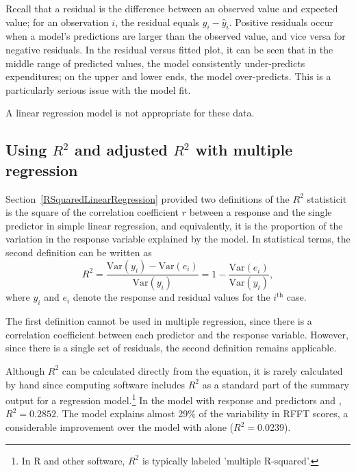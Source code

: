 \begin{example}
Recall that a residual is the difference between an observed value and expected value; for an observation $i$, the residual equals $y_i - \hat{y}_i$. Positive residuals occur when a model's predictions are larger than the observed value, and vice versa for negative residuals. In the residual versus fitted plot, it can be seen that in the middle range of predicted values, the model consistently under-predicts expenditures; on the upper and lower ends, the model over-predicts. This is a particularly serious issue with the model fit. 

A linear regression model is not appropriate for these data.	
	
\end{example}


\subsection{Using $R^2$ and adjusted $R^2$ with multiple regression}

Section~\ref{RSquaredLinearRegression} provided two definitions of the $R^2$ statistic\textemdash it is the square of the correlation coefficient $r$ between a response and the single predictor in simple linear regression, and equivalently, it is the proportion of the variation in the response variable explained by the model.  In statistical terms, the second definition can be written as 
\[
   R^2 = \frac{\text{Var}(y_i) - \text{Var}(e_i)}
   {\text{Var}(y_i)} = 1 - \frac{\text{Var}(e_i)}{\text{Var}(y_i)},
   \label{RSquareDefinition}\]
where $y_i$ and $e_i$ denote the response and residual values for the
$i^{\text{th}}$ case.

The first definition cannot be used in multiple regression, since there is a correlation coefficient between each predictor and the response variable. However, since there is a single set of residuals, the second definition remains applicable. 

Although $R^2$ can be calculated directly from the equation, it is rarely calculated by hand since computing software includes $R^2$ as a standard part of the summary output for a regression model.\footnote{In \textsf{R} and other software, $R^2$ is typically labeled 'multiple R-squared'.} In the model with response  and predictors  and , $R^2 = 0.2852$.  The model explains almost 29\% of the variability in RFFT scores, a considerable improvement over the model with  alone ($R^2 = 0.0239$).

